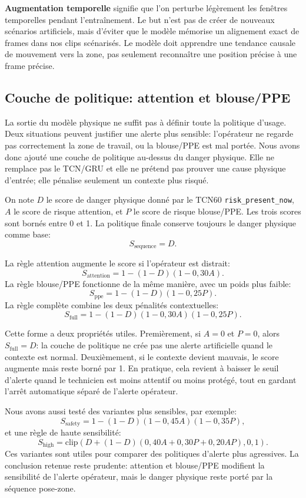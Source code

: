 \documentclass[11pt]{article}
\begin{document}
\textbf{Augmentation temporelle} signifie que l'on perturbe légèrement les fenêtres temporelles pendant l'entraînement. Le but n'est pas de créer de nouveaux scénarios artificiels, mais d'éviter que le modèle mémorise un alignement exact de frames dans nos clips scénarisés. Le modèle doit apprendre une tendance causale de mouvement vers la zone, pas seulement reconnaître une position précise à une frame précise.

\subsection{Couche de politique: attention et blouse/PPE}
La sortie du modèle physique ne suffit pas à définir toute la politique d'usage. Deux situations peuvent justifier une alerte plus sensible: l'opérateur ne regarde pas correctement la zone de travail, ou la blouse/PPE est mal portée. Nous avons donc ajouté une couche de politique au-dessus du danger physique. Elle ne remplace pas le TCN/GRU et elle ne prétend pas prouver une cause physique d'entrée; elle pénalise seulement un contexte plus risqué.

On note $D$ le score de danger physique donné par le TCN60 \texttt{risk\_present\_now}, $A$ le score de risque attention, et $P$ le score de risque blouse/PPE. Les trois scores sont bornés entre 0 et 1. La politique finale conserve toujours le danger physique comme base:
\[
S_{\mathrm{sequence}} = D.
\]

La règle attention augmente le score si l'opérateur est distrait:
\[
S_{\mathrm{attention}} = 1 - (1-D)(1-0,30A).
\]
La règle blouse/PPE fonctionne de la même manière, avec un poids plus faible:
\[
S_{\mathrm{ppe}} = 1 - (1-D)(1-0,25P).
\]
La règle complète combine les deux pénalités contextuelles:
\[
S_{\mathrm{full}} = 1 - (1-D)(1-0,30A)(1-0,25P).
\]

Cette forme a deux propriétés utiles. Premièrement, si $A=0$ et $P=0$, alors $S_{\mathrm{full}}=D$: la couche de politique ne crée pas une alerte artificielle quand le contexte est normal. Deuxièmement, si le contexte devient mauvais, le score augmente mais reste borné par 1. En pratique, cela revient à baisser le seuil d'alerte quand le technicien est moins attentif ou moins protégé, tout en gardant l'arrêt automatique séparé de l'alerte opérateur.

Nous avons aussi testé des variantes plus sensibles, par exemple:
\[
S_{\mathrm{safety}} = 1 - (1-D)(1-0,45A)(1-0,35P),
\]
et une règle de haute sensibilité:
\[
S_{\mathrm{high}} = \mathrm{clip}\left(D + (1-D)(0,40A + 0,30P + 0,20AP), 0, 1\right).
\]
Ces variantes sont utiles pour comparer des politiques d'alerte plus agressives. La conclusion retenue reste prudente: attention et blouse/PPE modifient la sensibilité de l'alerte opérateur, mais le danger physique reste porté par la séquence pose-zone.
\end{document}
